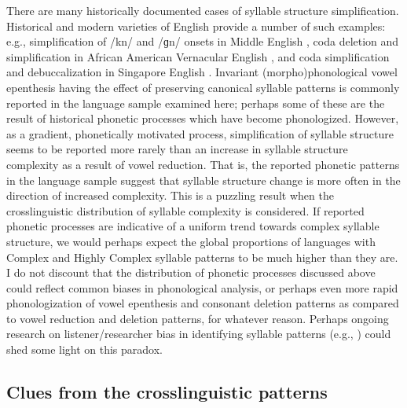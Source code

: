   There are many historically documented cases of syllable structure simplification. Historical and modern varieties of English provide a number of such examples: e.g., simplification of /kn/ and /ɡn/ onsets in Middle English \citep{Minkova2003}, coda deletion and simplification in African American Vernacular English \citep{Rickford1999}, and coda simplification and debuccalization in Singapore English \citep{Deterding2007}. Invariant (morpho)phonological vowel epenthesis having the effect of preserving canonical syllable patterns is commonly reported in the language sample examined here; perhaps some of these are the result of historical phonetic processes which have become phonologized. However, as a gradient, phonetically motivated process, simplification of syllable structure seems to be reported more rarely than an increase in syllable structure complexity as a result of vowel reduction. That is, the reported phonetic patterns in the language sample suggest that syllable structure change is more often in the direction of increased complexity. This is a puzzling result when the crosslinguistic distribution of syllable complexity is considered. If reported phonetic processes are indicative of a uniform trend towards complex syllable structure, we would perhaps expect the global proportions of languages with Complex and Highly Complex syllable patterns to be much higher than they are. I do not discount that the distribution of phonetic processes discussed above could reflect common biases in phonological analysis, or perhaps even more rapid phonologization of vowel epenthesis and consonant deletion patterns as compared to vowel reduction and deletion patterns, for whatever reason. Perhaps ongoing research on listener/researcher bias in identifying syllable patterns (e.g., \citealt{KwonEtAl2017}) could shed some light on this paradox.

\subsection{Clues from the crosslinguistic patterns}\label{sec:8.4.2}

